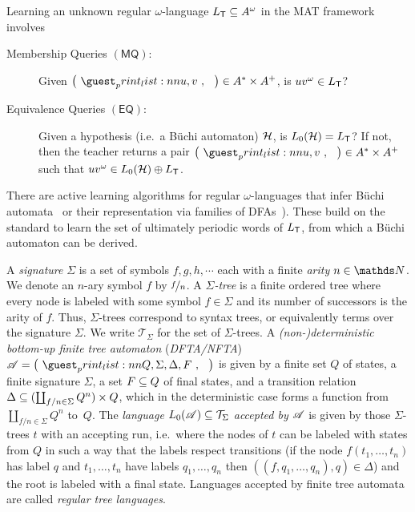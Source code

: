 \documentclass[a4paper,UKenglish,cleveref,autoref,thm-restate,numberwithinsect,final]{lipics-v2021}
\begin{document}
Learning an unknown regular $\omega$-language $L_\textsf{T}\subseteq A^\omega$ in the MAT framework involves
\begin{description}
        \item[Membership Queries $(\textsf{MQ})$:] Given $\maketuple{u, v} \in
            A^* \times A^+$, is $uv^\omega\in L_\textsf{T}$?
        \item[Equivalence Queries $(\textsf{EQ})$:] Given a hypothesis (i.e.~a Büchi automaton) $\mathcal{H}$,
            is $L_0(\mathcal{H})=L_\textsf{T}$? If not, then the teacher returns a pair $\maketuple{u, v} \in A^* \times A^+$ such that $uv^\omega \in L_0(\mathcal{H}) \oplus L_\textsf{T}$.
    \end{description}
    There are active learning algorithms for regular $\omega$-languages that infer Büchi automata~\cite{fcctw08}
    or their representation via families of DFAs~\cite{af16,lczl21}). These build on the standard \Lstar{} to learn the set of
    ultimately periodic words of $L_\textsf{T}$, from which a Büchi automaton can be derived.

  A \emph{signature}
    $\Sigma$ is a set of symbols $f,g,h,\cdots$ each with a finite \emph{arity} $n \in \Nat$. We denote an $n$-ary symbol $f$ by $\nicefrac{f}{n}$. A \emph{$\Sigma$-tree} is a finite ordered tree where every node is labeled with some symbol $f\in \Sigma$ and its number of successors is the arity of $f$. Thus, $\Sigma$-trees correspond to syntax trees, or equivalently terms over the signature $\Sigma$. We write $\mathcal{T}_\Sigma$ for the set of {$\Sigma$-trees}. A \emph{(non-)deterministic bottom-up finite tree automaton} (\emph{DFTA/NFTA}) $\A = \maketuple{Q,
                \Sigma, \Delta, F}$ is given by a finite set $Q$ of states, a finite signature $\Sigma$, a set $F\subseteq Q$ of final states, and a transition relation $\Delta \subseteq (\coprod_{f/n\in \Sigma} Q^n)\times Q$, which in the deterministic case forms a function from $\coprod_{ f/n\in \Sigma} Q^n$ to~$Q$. The \emph{language}
                $L_0(\mathscr{A})\subseteq \mathcal{T}_\Sigma$ \emph{accepted by $\mathscr{A}$} is given by those $\Sigma$-trees $t$ with an accepting run, i.e.~where the nodes of $t$ can be labeled with states from $Q$ in such a way that the labels respect transitions (if the node $f(t_1,\ldots,t_n)$ has label $q$ and $t_1,\ldots,t_n$ have labels $q_1,\ldots,q_n$ then $((f,q_1,\ldots,q_n),q)\in \Delta$) and the root is labeled with a final state. Languages accepted by finite tree automata are called \emph{regular tree languages}.
\end{document}
